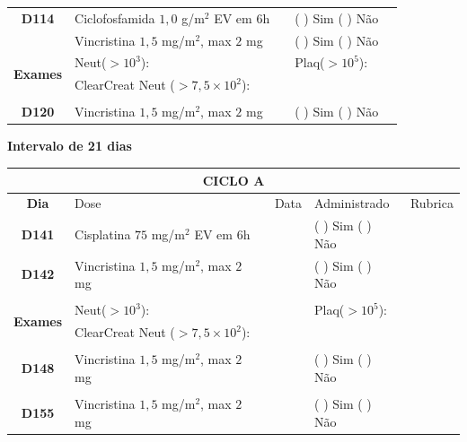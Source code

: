\documentclass[11pt,a4paper,oldfontcommands]{memoir}
\begin{document}
\begin{center}
\begin{table}[H]
\begin{tabular}{p{1cm}p{6cm}|p{1cm}|p{3cm}|p{2.5cm}}
    \multicolumn{1}{c|}{\multirow{1}{*}{\textbf{D114}}}&{Ciclofosfamida \(1,0\) g/m\(^2\) EV em 6h}&&{(  ) Sim (  ) Não}&\\
    \multicolumn{1}{c|}{\multirow{1}{*}{\textbf{}}}&{Vincristina \(1,5\) mg/m\(^2\), max \(2\) mg}&&{(  ) Sim (  ) Não}&\\
    \hline
    \multicolumn{1}{c|}{\multirow{2}{*}{\textbf{Exames}}}&\multicolumn{2}{l|}{Neut(\(>10^3\)):}&{Plaq(\(>10^5\)):}&\\
    \cline{2-5}
    \multicolumn{1}{c|}{\multirow{2}{*}{{}}}&\multicolumn{2}{l|}{ClearCreat Neut (\(>7,5\times10^2\)):}&{}&{}\\
    \hline
    \\
    \hline
    \multicolumn{1}{c|}{\multirow{1}{*}{\textbf{D120}}}&{Vincristina \(1,5\) mg/m\(^2\), max \(2\) mg}&&{(  ) Sim (  ) Não}&\\
    \hline
\end{tabular}
\end{table}
\textbf{Intervalo de 21 dias}
\begin{table}[H]
\begin{tabular}{p{1cm}p{6cm}|p{1cm}|p{3cm}|p{2.5cm}}
	\hline
	\multicolumn{5}{c}{\textbf{CICLO A}}\\
\hline
    \multicolumn{1}{c|}{\multirow{1}{*}{\textbf{Dia}}}&{Dose}&{Data}&{Administrado}&{Rubrica} \\
    \hline
    \multicolumn{1}{c|}{\multirow{1}{*}{\textbf{D141}}}&{Cisplatina \(75\) mg/m\(^2\) EV em 6h}&&{(  ) Sim (  ) Não}&\\
    \multicolumn{1}{c|}{\multirow{1}{*}{\textbf{D142}}}&{Vincristina \(1,5\) mg/m\(^2\), max \(2\) mg}&&{(  ) Sim (  ) Não}&\\
    \multicolumn{1}{c|}{\multirow{1}{*}{\textbf{}}}&&&&\\
    \hline
    \multicolumn{1}{c|}{\multirow{2}{*}{\textbf{Exames}}}&\multicolumn{2}{l|}{Neut(\(>10^3\)):}&{Plaq(\(>10^5\)):}&\\
    \cline{2-5}
    \multicolumn{1}{c|}{\multirow{2}{*}{{}}}&\multicolumn{2}{l|}{ClearCreat Neut (\(>7,5\times10^2\)):}&{}&{}\\
    \hline
    \\
    \hline
    \multicolumn{1}{c|}{\multirow{1}{*}{\textbf{D148}}}&{Vincristina \(1,5\) mg/m\(^2\), max \(2\) mg}&&{(  ) Sim (  ) Não}&\\
    \hline
    \\
    \hline
    \multicolumn{1}{c|}{\multirow{1}{*}{\textbf{D155}}}&{Vincristina \(1,5\) mg/m\(^2\), max \(2\) mg}&&{(  ) Sim (  ) Não}&\\
    \hline
    \end{tabular}
    \end{table}
    

\end{center}
\end{document}
